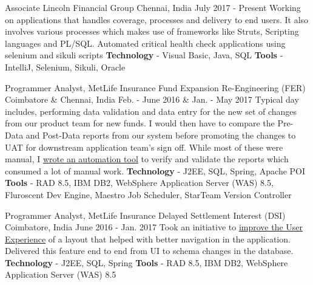 

\begin{cventries}

  \cventry
    {Associate} %
    {Lincoln Financial Group} %
    {Chennai, India} %
    {July 2017 - Present} %
    {
        Working on applications that handles coverage, processes and delivery to end users. It also involves various processes which makes use of frameworks like Struts, Scripting languages and PL/SQL.
        \newline
        Automated critical health check applications using selenium and sikuli scripts\newline
        \textbf{Technology} - Visual Basic, Java, SQL \newline
        \textbf{Tools} - IntelliJ, Selenium, Sikuli, Oracle
    }

  \cventry
    {Programmer Analyst, MetLife Insurance} %
    {Fund Expansion Re-Engineering (FER)} %
    {Coimbatore \& Chennai, India} %
    {Feb. - June 2016 \& Jan. - May 2017} %
    {
        Typical day includes, performing data validation and data entry for the new set of changes from our product team for new funds. I would then have to compare the Pre-Data and Post-Data reports from our system before promoting the changes to UAT for downstream application team's sign off. While most of these were manual, I \underline{wrote an automation tool} to verify and validate the reports which consumed a lot of manual work.
        \newline
        \textbf{Technology} - J2EE, SQL, Spring, Apache POI \newline
        \textbf{Tools} - RAD 8.5, IBM DB2, WebSphere Application Server (WAS) 8.5, Fluroscent Dev Engine, Maestro Job Scheduler, StarTeam Version Controller
    }

  \cventry
    {Programmer Analyst, MetLife Insurance} %
    {Delayed Settlement Interest (DSI)} %
    {Coimbatore, India} %
    {June 2016 - Jan. 2017} %
    {
        Took an initiative to \underline{improve the User Experience} of a layout that helped with better navigation in the application. Delivered this feature end to end from UI to schema changes in the database. 
        \newline
        \textbf{Technology} - J2EE, SQL, Spring \newline
        \textbf{Tools} - RAD 8.5, IBM DB2, WebSphere Application Server (WAS) 8.5
    }


\end{cventries}
